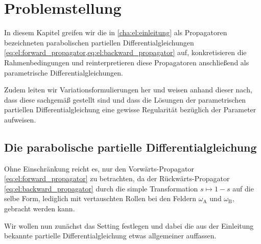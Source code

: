 
\chapter{Problemstellung} %
\label{cha:ps:problemstellung}

In diesem Kapitel greifen wir die in \cref{cha:el:einleitung} als Propagatoren bezeichneten parabolischen partiellen Differentialgleichungen \cref{eq:el:forward_propagator,eq:el:backward_propagator} auf, konkretisieren die Rahmenbedingungen und reinterpretieren diese Propagatoren anschließend als parametrische Differentialgleichungen.

Zudem leiten wir Variationsformulierungen her und weisen anhand dieser nach, dass diese sachgemäß gestellt sind und dass die Lösungen der parametrischen partiellen Differentialgleichung eine gewisse Regularität bezüglich der Parameter aufweisen.


\section{Die parabolische partielle Differentialgleichung} %
\label{sec:ps:pde:die_parabolische_partielle_differentialgleichung}

Ohne Einschränkung reicht es, nur den Vorwärts-Propagator \cref{eq:el:forward_propagator} zu betrachten, da der Rückwärts-Propagator \cref{eq:el:backward_propagator} durch die simple Transformation $s \mapsto 1 - s$ auf die selbe Form, lediglich mit vertauschten Rollen bei den Feldern $\omega_{\mathrm{A}}$ und $\omega_{\mathrm{B}}$, gebracht werden kann.

Wir wollen nun zunächst das Setting festlegen und dabei die aus der Einleitung bekannte partielle Differentialgleichung etwas allgemeiner auffassen.

